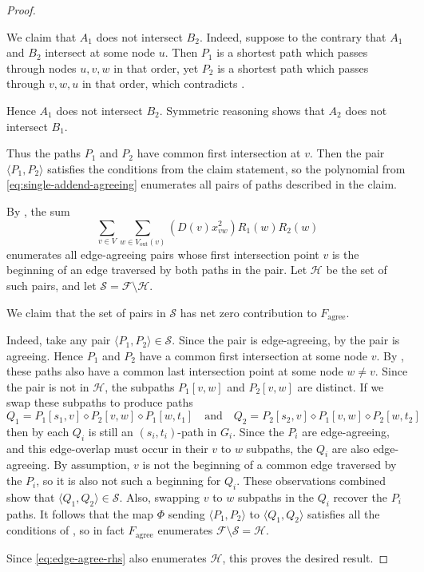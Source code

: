 \documentclass[11pt]{article}
\newcommand{\grp}[1]{\left(#1\right)}
\newcommand{\pair}[1]{\langle #1\rangle}
\newcommand{\dia}{\diamond}
\newcommand{\ca}{\mathcal}
\renewcommand{\t}{\text}
\newcommand{\vout}{V_{\t{out}}}
\newcommand{\agree}{\text{agree}}
\newcommand{\Fagree}{F_{\agree}}
\theoremstyle{definition}
\begin{document}
\begin{proof}
\begin{claimproof}
            We claim that $A_1$ does not intersect $B_2$.
            Indeed, suppose to the contrary that $A_1$ and $B_2$ intersect at some node $u$.
            Then $P_1$ is a shortest path which passes through nodes $u,v,w$ in that order, yet $P_2$ is a shortest path which passes through $v,w,u$ in that order, which contradicts .

            Hence $A_1$ does not intersect $B_2$.
            Symmetric reasoning shows that $A_2$ does not intersect $B_1$.
            
            Thus the paths $P_1$ and $P_2$ have common first intersection at $v$.
            Then the pair $\pair{P_1,P_2}$ satisfies the conditions from the claim statement, so the polynomial from \cref{eq:single-addend-agreeing} enumerates all pairs of paths described in the claim.
    \end{claimproof}
    By , the sum 
   \begin{equation}
   \label{eq:edge-agree-rhs}
    \sum_{v\in V}
        \sum_{w\in \vout(v)} \grp{D(v)x_{vw}^2} R_1(w)R_2(w)
   \end{equation}
   enumerates all edge-agreeing pairs  whose first intersection point $v$ is the beginning of an edge traversed by both paths in the pair.
   Let $\ca{H}$ be the set of such pairs, and let $\ca{S}=\ca{F}\setminus\ca{H}$.

   We claim that the set of pairs in $\ca{S}$ has net zero contribution to $\Fagree$.
   
   Indeed, take any pair $\langle P_1, P_2\rangle\in \ca{S}$.
    Since the pair is edge-agreeing, by  the pair is agreeing.
    Hence 
    $P_1$ and $P_2$ have a common first intersection at some node $v$.
    By , these paths also have a common last intersection point at some node $w\neq v$.
    Since the pair is not in $\ca{H}$, the subpaths $P_1[v,w]$ and $P_2[v,w]$ are distinct.
    If we swap these subpaths 
    to produce paths 
        \[Q_1 = P_1[s_1,v] \dia P_2[v,w]\dia P_1[w,t_1]\quad\text{and}\quad 
        Q_2 = P_2[s_2,v]\dia P_1[v,w]\dia P_2[w,t_2]\]
    then by  each $Q_i$ is still an $(s_i,t_i)$-path in $G_i$.
    Since the $P_i$ are edge-agreeing, and this edge-overlap must occur in their $v$ to $w$ subpaths, the  $Q_i$ are also edge-agreeing.
    By assumption, $v$ is not the beginning of a common edge traversed by the $P_i$, so it is also not such a beginning for $Q_i$.
    These observations combined show that $\langle Q_1,Q_2\rangle\in\ca{S}$.
    Also, swapping $v$ to $w$ subpaths in the $Q_i$ recover the $P_i$ paths.
    It follows that the map $\Phi$ sending $\langle P_1,P_2\rangle$ to $\langle Q_1,Q_2\rangle$ satisfies all the conditions of , so in fact $\Fagree$ enumerates $\ca{F}\setminus\ca{S} = \ca{H}$.
    
    Since \cref{eq:edge-agree-rhs} also enumerates $\ca{H}$, this proves the desired result.
\end{proof}
\end{document}
